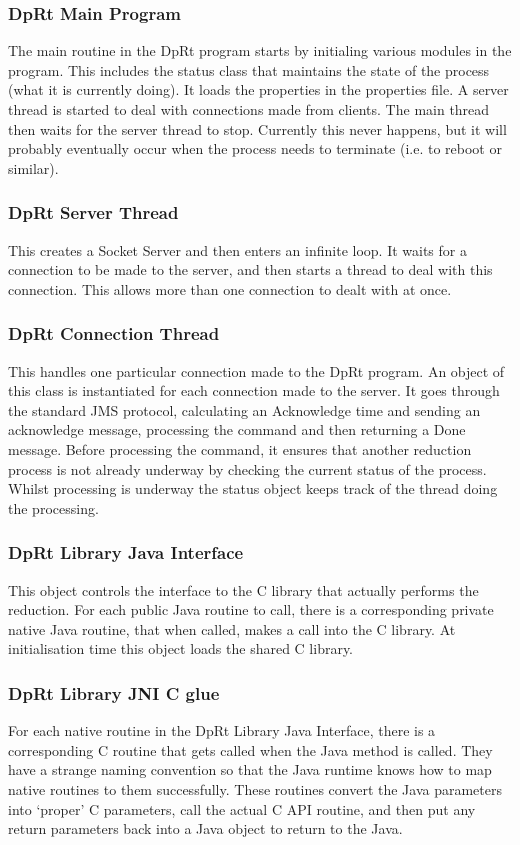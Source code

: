 \documentclass[10pt,a4paper]{article}
\begin{document}
\subsubsection{DpRt Main Program}
The main routine in the DpRt program starts by initialing various modules in the program. This includes the status 
class that maintains the state of the process (what it is currently doing). It loads the properties in the
properties file. A server thread is started to deal with connections made from clients. The main thread then waits
for the server thread to stop. Currently this never happens, but it will probably eventually occur when the 
process needs to terminate (i.e. to reboot or similar).

\subsubsection{DpRt Server Thread}
This creates a Socket Server and then enters an infinite loop. It waits for a connection to be made to the server,
and then starts a thread to deal with this connection. This allows more than one connection to dealt with 
at once.

\subsubsection{DpRt Connection Thread}
This handles one particular connection made to the DpRt program. An object of this class is instantiated for
each connection made to the server. It goes through the standard JMS protocol, calculating an Acknowledge time and
sending an acknowledge message, processing the command and then returning a Done message. Before processing the
command, it ensures that another reduction process is not already underway by checking the current
status of the process. Whilst processing is underway the status object keeps track of the thread doing the 
processing.

\subsubsection{DpRt Library Java Interface}
This object controls the interface to the C library that actually performs the reduction. For each public
Java routine to call, there is a corresponding private native Java routine, that when called, makes a call
into the C library. At initialisation time this object loads the shared C library. 

\subsubsection{DpRt Library JNI C glue}
For each native routine in the DpRt Library Java Interface, there is a corresponding C routine that gets called when
the Java method is called. They have a strange naming convention so that the Java runtime knows how to map
native routines to them successfully. These routines convert the Java parameters into `proper' C parameters, call
the actual C API routine, and then put any return parameters back into a Java object to return to the Java.
\end{document}
